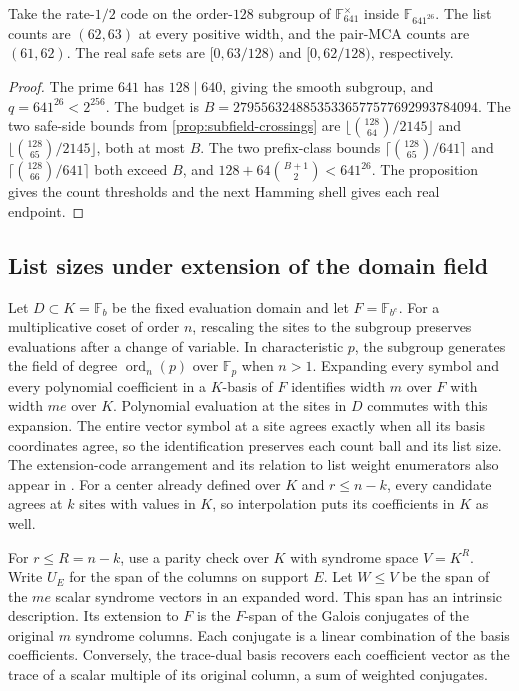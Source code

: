 \begin{corollary}
\label{cor:subfield-128-thresholds}
Take the rate-\(1/2\) code on the order-\(128\) subgroup of
\(\mathbb F_{641}^{\times}\) inside \(\mathbb F_{641^{26}}\).
The list counts are \((62,63)\) at every positive width, and the pair-MCA
counts are \((61,62)\). The real safe sets are \([0,63/128)\) and
\([0,62/128)\), respectively.
\end{corollary}

\begin{proof}
The prime \(641\) has \(128\mid640\), giving the smooth subgroup, and
\(q=641^{26}<2^{256}\). The budget is
\(B=27955632488535336577577692993784094\).
The two safe-side bounds from \cref{prop:subfield-crossings} are
\(\lfloor\binom{128}{64}/2145\rfloor\) and
\(\lfloor\binom{128}{65}/2145\rfloor\), both at most \(B\).
The two prefix-class bounds \(\lceil\binom{128}{65}/641\rceil\) and
\(\lceil\binom{128}{66}/641\rceil\) both exceed \(B\), and
\(128+64\binom{B+1}{2}<641^{26}\). The proposition gives the count
thresholds and the next Hamming shell gives each real endpoint.
\end{proof}

\subsection{List sizes under extension of the domain field}
\label{sec:list-descent}

Let \(D\subset K=\mathbb F_b\) be the fixed evaluation domain and let
\(F=\mathbb F_{b^e}\). For a multiplicative coset of order \(n\), rescaling
the sites to the subgroup preserves evaluations after a change of variable.
In characteristic \(p\), the subgroup generates the field of degree
\(\operatorname{ord}_n(p)\) over \(\mathbb F_p\) when \(n>1\).
Expanding every symbol and every polynomial
coefficient in a \(K\)-basis of \(F\) identifies width \(m\) over \(F\)
with width \(me\) over \(K\). Polynomial evaluation at the sites in \(D\)
commutes with this expansion. The entire vector symbol at a site agrees
exactly when all its basis coordinates agree, so the identification
preserves each count ball and its list size. The extension-code arrangement
and its relation to list weight enumerators also appear in
\cite{jurriusPellikaan2015}.
For a center already defined over \(K\) and \(r\le n-k\), every candidate
agrees at \(k\) sites with values in \(K\), so interpolation puts its
coefficients in \(K\) as well.

For \(r\le R=n-k\), use a parity check over \(K\) with syndrome space
\(V=K^R\). Write \(U_E\) for the span of the columns on support \(E\).
Let \(W\le V\) be the span of the \(me\) scalar syndrome vectors in an
expanded word. This span has an intrinsic description. Its extension to
\(F\) is the \(F\)-span of the Galois conjugates of the original \(m\)
syndrome columns. Each conjugate is a linear combination of the basis
coefficients. Conversely, the trace-dual basis recovers each coefficient
vector as the trace of a scalar multiple of its original column, a sum of
weighted conjugates.

